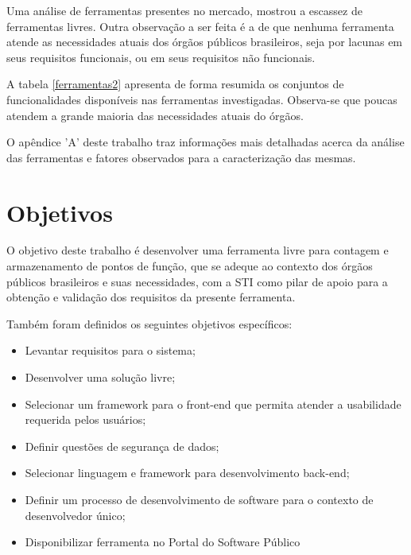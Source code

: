 Uma análise de ferramentas presentes no mercado, mostrou a escassez de ferramentas livres. Outra observação a ser feita é a de que nenhuma ferramenta atende as necessidades atuais dos órgãos públicos brasileiros, seja por lacunas em seus requisitos funcionais, ou em seus requisitos não funcionais.

A tabela \ref{ferramentas2} apresenta de forma resumida os conjuntos de funcionalidades disponíveis nas ferramentas investigadas. Observa-se que poucas atendem a grande maioria das necessidades atuais do órgãos.

O apêndice 'A' deste trabalho traz informações mais detalhadas acerca da análise das ferramentas e fatores observados para a caracterização das mesmas.

\section{Objetivos}

O objetivo deste trabalho é desenvolver uma ferramenta livre para contagem e
armazenamento de pontos de função, que se adeque ao contexto dos órgãos públicos brasileiros e suas necessidades, com a STI como pilar de apoio para a obtenção e validação dos requisitos da presente ferramenta.

Também foram definidos os seguintes objetivos específicos:

\begin{itemize}

  \item Levantar requisitos para o sistema;

  \item Desenvolver uma solução livre;

  \item Selecionar um framework para o front-end que permita atender a usabilidade requerida pelos usuários;

  \item  Definir questões de segurança de dados;

  \item Selecionar linguagem e framework para desenvolvimento back-end;

  \item Definir um processo de desenvolvimento de software para o contexto de
  desenvolvedor único;

  \item Disponibilizar ferramenta no Portal do Software Público

\end{itemize}

